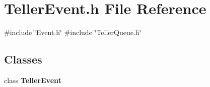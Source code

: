 \section{Teller\+Event.\+h File Reference}
\label{TellerEvent_8h}
{\ttfamily \#include \char`\"{}Event.\+h\char`\"{}}\newline
{\ttfamily \#include \char`\"{}Teller\+Queue.\+h\char`\"{}}\newline
\subsection*{Classes}
\begin{DoxyCompactItemize}
\item 
class \textbf{ Teller\+Event}
\end{DoxyCompactItemize}
